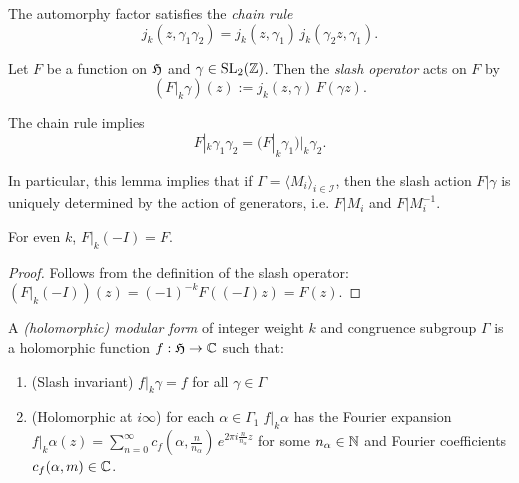 \begin{lemma}\label{lemma:automorphy-factor-chain-rule}\leanok
    The automorphy factor satisfies the \emph{chain rule}
$$j_k(z,\gamma_1\gamma_2)=j_k(z,\gamma_1)\,j_k(\gamma_2z,\gamma_1). $$
\end{lemma}

\begin{definition}\label{def:slash-operator}\leanok
    Let $F$ be a function on $\mathfrak{H}$ and $\gamma\in\mathrm{SL}_2(\mathbb{Z})$. Then the \emph{slash operator} acts on $F$ by
$$(F|_k\gamma)(z):=j_k(z,\gamma)\,F(\gamma z). $$
\end{definition}

\begin{lemma}\label{lemma:slash-operator-chain-rule}\leanok
  The chain rule implies $$F|_k\gamma_1\gamma_2=(F|_k\gamma_1)|_k\gamma_2.$$
\end{lemma}

In particular, this lemma implies that if $\Gamma = \langle M_i \rangle_{i \in \mathcal{I}}$, then the slash action $F|\gamma$ is uniquely determined by the action of generators, i.e. $F|M_i$ and $F|M_i^{-1}$.

\begin{lemma}\label{lemma:slash-negI-even-weight}\leanok
   For even $k$, $F|_{k}(-I) = F$.
\end{lemma}
\begin{proof}
Follows from the definition of the slash operator:
$(F|_{k}(-I))(z) = (-1)^{-k}F((-I)z) = F(z)$.
\end{proof}

\begin{definition}\label{def:holomorphic-modular-form}\leanok
A \emph{(holomorphic) modular form} of integer weight $k$ and congruence subgroup $\Gamma$ is a holomorphic function $f:\mathfrak{H}\to\mathbb{C}$ such that:
\begin{enumerate}
  \item{(Slash invariant)} $f|_k\gamma=f$ for all $\gamma\in\Gamma$
  \item{(Holomorphic at $i\infty$)} for each $\alpha\in\Gamma_1\;f|_k\alpha$ has the Fourier expansion $f|_k\alpha (z)=\sum_{n=0}^\infty c_f(\alpha,\frac{n}{n_\alpha})\,e^{2\pi i \frac{n}{n_\alpha}z}$ for some $n_\alpha\in\mathbb{N}$ and Fourier coefficients $c_f(\alpha,m)\in\mathbb{C}$.
\end{enumerate}
\end{definition}

